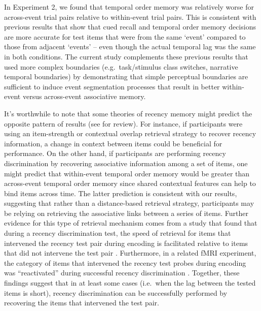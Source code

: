 In Experiment 2, we found that temporal order memory was relatively
worse for across-event trial pairs relative to within-event trial pairs.
This is consistent with previous results that show that cued recall
\autocite{ezzyat_what_2011} and temporal order memory decisions
\autocite{dubrow_influence_2013} are more accurate for test items that
were from the same `event' compared to those from adjacent `events' --
even though the actual temporal lag was the same in both conditions. The
current study complements these previous results that used more complex
boundaries (e.g.~task/stimulus class switches, narrative temporal
boundaries) by demonstrating that simple perceptual boundaries are
sufficient to induce event segmentation processes that result in better
within-event versus across-event associative memory.

It's worthwhile to note that some theories of recency memory might
predict the opposite pattern of results (see
\textcite{friedman_memory_1993} for review). For instance, if
participants were using an item-strength or contextual overlap retrieval
strategy to recover recency information, a change in context between
items could be beneficial for performance. On the other hand, if
participants are performing recency discrimination by recovering
associative information among a set of items, one might predict that
within-event temporal order memory would be greater than across-event
temporal order memory since shared contextual features can help to bind
items across time. The latter prediction is consistent with our results,
suggesting that rather than a distance-based retrieval strategy,
participants may be relying on retrieving the associative links between
a series of items. Further evidence for this type of retrieval mechanism
comes from a study that found that during a recency discrimination test,
the speed of retrieval for items that intervened the recency test pair
during encoding is facilitated relative to items that did not intervene
the test pair \autocite{dubrow_temporal_2014}. Furthermore, in a related
fMRI experiment, the category of items that intervened the recency test
probes during encoding was ``reactivated'' during successful recency
discrimination \autocite{dubrow_temporal_2014}. Together, these findings
suggest that in at least some cases (i.e.~when the lag between the
tested items is short), recency discrimination can be successfully
performed by recovering the items that intervened the test pair.

